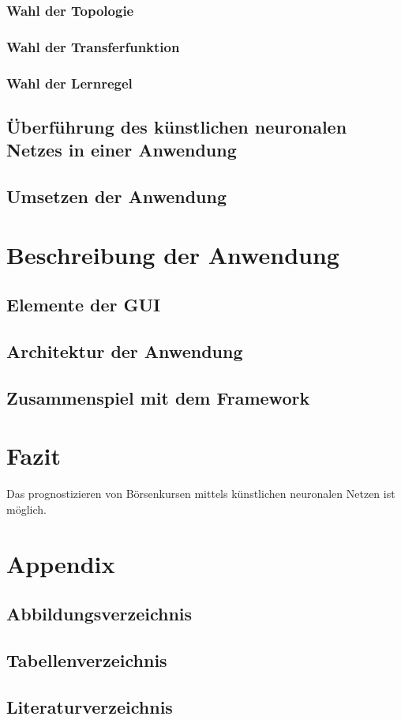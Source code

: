\documentclass[11pt,a4paper]{scrreprt}
\begin{document}
		\subsection{Wahl der Topologie} %
		\subsection{Wahl der Transferfunktion} %
		\subsection{Wahl der Lernregel} %
	\section{Überführung des künstlichen neuronalen Netzes in einer Anwendung}
	\section{Umsetzen der Anwendung} %

\chapter{Beschreibung der Anwendung} %
	\section{Elemente der GUI} %
	\section{Architektur der Anwendung} %
	\section{Zusammenspiel mit dem Framework} %

\chapter{Fazit} %
Das prognostizieren von Börsenkursen mittels künstlichen neuronalen Netzen ist möglich.

\chapter{Appendix}
	\section{Abbildungsverzeichnis}
	\section{Tabellenverzeichnis}
	\section{Literaturverzeichnis}
\end{document}
